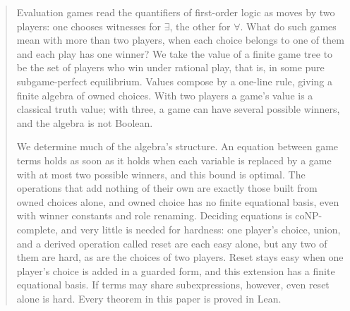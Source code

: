 \begin{abstract}
Evaluation games read the quantifiers of first-order logic as moves by two players: one chooses witnesses for $\exists$, the other for $\forall$. What do such games mean with more than two players, when each choice belongs to one of them and each play has one winner? We take the value of a finite game tree to be the set of players who win under rational play, that is, in some pure subgame-perfect equilibrium. Values compose by a one-line rule, giving a finite algebra of owned choices. With two players a game's value is a classical truth value; with three, a game can have several possible winners, and the algebra is not Boolean.

We determine much of the algebra's structure. An equation between game terms holds as soon as it holds when each variable is replaced by a game with at most two possible winners, and this bound is optimal. The operations that add nothing of their own are exactly those built from owned choices alone, and owned choice has no finite equational basis, even with winner constants and role renaming. Deciding equations is coNP-complete, and very little is needed for hardness: one player's choice, union, and a derived operation called reset are each easy alone, but any two of them are hard, as are the choices of two players. Reset stays easy when one player's choice is added in a guarded form, and this extension has a finite equational basis. If terms may share subexpressions, however, even reset alone is hard. Every theorem in this paper is proved in Lean.
\end{abstract}
